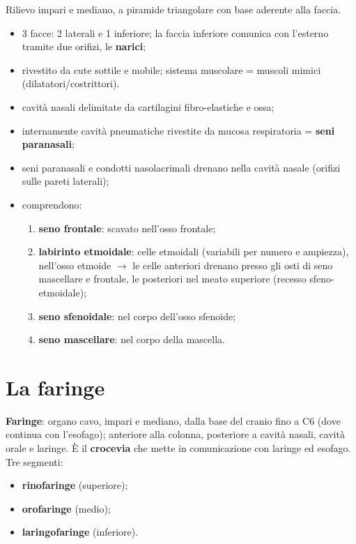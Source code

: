 Rilievo impari e mediano, a piramide triangolare con base aderente alla faccia.
\begin{itemize}
  \item 3 facce: 2 laterali e 1 inferiore; la faccia inferiore comunica con l'esterno tramite due
    orifizi, le \textbf{narici};
  \item rivestito da cute sottile e mobile; sistema muscolare = muscoli mimici (dilatatori/costrittori).
\end{itemize}

\begin{itemize}
  \item cavità nasali delimitate da cartilagini fibro-elastiche e ossa;
  \item internamente cavità pneumatiche rivestite da mucosa respiratoria = \textbf{seni paranasali};
  \item seni paranasali e condotti nasolacrimali drenano nella cavità nasale (orifizi sulle pareti
    laterali);
  \item comprendono:
    \begin{enumerate}
      \item \textbf{seno frontale}: scavato nell'osso frontale;
      \item \textbf{labirinto etmoidale}: celle etmoidali (variabili per numero e ampiezza),
        nell'osso etmoide $\rightarrow$ le celle anteriori drenano presso gli osti di seno mascellare
        e frontale, le posteriori nel meato superiore (recesso sfeno-etmoidale);
      \item \textbf{seno sfenoidale}: nel corpo dell'osso sfenoide;
      \item \textbf{seno mascellare}: nel corpo della mascella.
    \end{enumerate}
\end{itemize}

\section{La faringe}

\textbf{Faringe}: organo cavo, impari e mediano, dalla base del cranio fino a C6 (dove continua con
l'esofago); anteriore alla colonna, posteriore a cavità nasali, cavità orale e laringe. È il
\textbf{crocevia} che mette in comunicazione con laringe ed esofago. Tre segmenti:
\begin{itemize}
  \item \textbf{rinofaringe} (superiore);
  \item \textbf{orofaringe} (medio);
  \item \textbf{laringofaringe} (inferiore).
\end{itemize}

